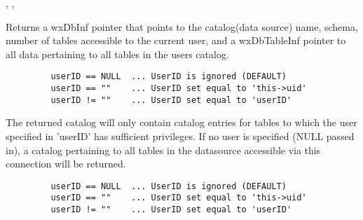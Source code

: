 
, , 

\label{wxdbgetcatalog}


Returns a wxDbInf pointer that points to the catalog(data source) name, schema, number of tables accessible to the current user, and a wxDbTableInf pointer to all data pertaining to all tables in the users catalog.



\begin{verbatim}
         userID == NULL  ... UserID is ignored (DEFAULT)
         userID == ""    ... UserID set equal to 'this->uid'
         userID != ""    ... UserID set equal to 'userID'
\end{verbatim}


The returned catalog will only contain catalog entries for tables to which the user specified in 'userID' has sufficient privileges.  If no user is specified (NULL passed in), a catalog pertaining to all tables in the datasource accessible via this connection will be returned.

\label{wxdbgetcolumncount}





\begin{verbatim}
         userID == NULL  ... UserID is ignored (DEFAULT)
         userID == ""    ... UserID set equal to 'this->uid'
         userID != ""    ... UserID set equal to 'userID'
\end{verbatim}

